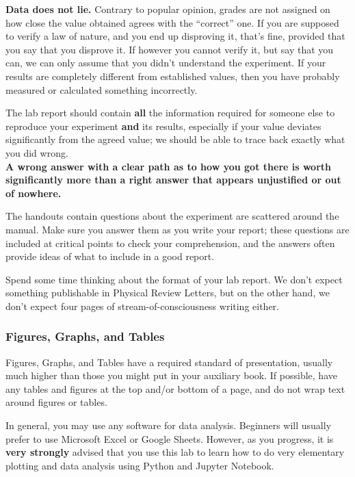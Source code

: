 \textbf{Data does not lie.} Contrary to popular opinion, grades are not assigned on how close the value obtained agrees with the ``correct'' one. If you are supposed to verify a law of nature, and you end up disproving it, that's fine, provided that you say that you disprove it. If however you cannot verify it, but say that you can, we can only assume that you didn't understand the experiment. If your results are completely different from established values, then you have probably measured or calculated something incorrectly. 

\begin{imp}
The lab report should contain \textbf{all} the information required for someone else to reproduce your experiment \textbf{and} its results, especially if your value deviates significantly from the agreed value; we should be able to trace back exactly what you did wrong.~\\

\textbf{A wrong answer with a clear path as to how you got there is worth significantly more than a right answer that appears unjustified or out of nowhere. }
\end{imp}

The handouts contain questions about the experiment are scattered around the manual. Make sure you answer them as you write your report; these questions are included at critical points to check your comprehension, and the answers often provide ideas of what to include in a good report. 

\begin{imp}
Spend some time thinking about the format of your lab report. We don't expect something publishable in Physical Review Letters, but on the other hand, we don't expect four pages of stream-of-consciousness writing either.
\end{imp}

\subsubsection{Figures, Graphs, and Tables}

Figures, Graphs, and Tables have a required standard of presentation, usually much higher than those you might put in your auxiliary book. If possible, have any tables and figures at the top and/or bottom of a page, and do not wrap text around figures or tables.

\begin{imp}
In general, you may use any software for data analysis. Beginners will usually prefer to use Microsoft Excel or Google Sheets. However, as you progress, it is \textbf{very strongly} advised that you use this lab to learn how to do very elementary plotting and data analysis using Python and Jupyter Notebook.
\end{imp}


